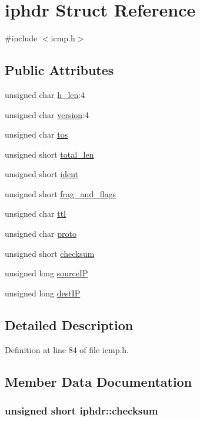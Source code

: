 \hypertarget{structiphdr}{\section{iphdr \-Struct \-Reference}
\label{structiphdr}
}


{\ttfamily \#include $<$icmp.\-h$>$}

\subsection*{\-Public \-Attributes}
\begin{DoxyCompactItemize}
\item 
unsigned char \hyperlink{structiphdr_a73f32935489a36a25baa9672f7e82cd0}{h\-\_\-len}\-:4
\item 
unsigned char \hyperlink{structiphdr_a232d177bba2eefdbab013bed9f8faf5d}{version}\-:4
\item 
unsigned char \hyperlink{structiphdr_a2efd9259c6f056707ceb0ae5bae5c90f}{tos}
\item 
unsigned short \hyperlink{structiphdr_abb34ffd5b3f3ea01b6981beda60359b6}{total\-\_\-len}
\item 
unsigned short \hyperlink{structiphdr_a5b9e10a88a5e925dd2fe53ad6e29e7a7}{ident}
\item 
unsigned short \hyperlink{structiphdr_a0d2e71cfe4d60b3fd494f89defd36403}{frag\-\_\-and\-\_\-flags}
\item 
unsigned char \hyperlink{structiphdr_acf6d9c663bfb22293ce2fadec78b7c9a}{ttl}
\item 
unsigned char \hyperlink{structiphdr_a8a39de7dc525754725363dc25fc75ae2}{proto}
\item 
unsigned short \hyperlink{structiphdr_ab16ea47d06f82b80994f3182b89fe26e}{checksum}
\item 
unsigned long \hyperlink{structiphdr_acb14e7dce69ddfa7895bb42c4268059e}{source\-I\-P}
\item 
unsigned long \hyperlink{structiphdr_a7131889c7b92b38bdeaac511bf7b6cc4}{dest\-I\-P}
\end{DoxyCompactItemize}


\subsection{\-Detailed \-Description}


\-Definition at line 84 of file icmp.\-h.



\subsection{\-Member \-Data \-Documentation}
\hypertarget{structiphdr_ab16ea47d06f82b80994f3182b89fe26e}{
\subsubsection[{checksum}]{\setlength{\rightskip}{0pt plus 5cm}unsigned short {\bf iphdr\-::checksum}}}\label{structiphdr_ab16ea47d06f82b80994f3182b89fe26e}


